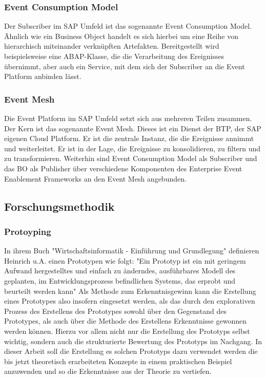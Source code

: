 \subsubsection*{Event Consumption Model}
\label{ecm}
Der Subscriber im SAP Umfeld ist das sogenannte Event Consumption Model. Ähnlich wie ein Business Object handelt es sich hierbei um eine Reihe von hierarchisch miteinander verknüpften Artefakten. Bereitgestellt wird beispielsweise eine \ac{ABAP}-Klasse, die die Verarbeitung des Ereignisses übernimmt, aber auch ein Service, mit dem sich der Subscriber an die Event Platform anbinden lässt. \cite[Vgl.][]{sapse_bes}

\subsubsection*{Event Mesh}
Die Event Platform im  SAP Umfeld setzt sich aus mehreren Teilen zusammen. Der Kern ist das sogenannte Event Mesh. Dieses ist ein Dienst der \ac{BTP}, der SAP eigenen Cloud Platform. Er ist die zentrale Instanz, die die Ereignisse annimmt und weiterleitet. Er ist in der Lage, die Ereignisse zu konsolidieren, zu filtern und zu transformieren. Weiterhin sind Event Consumption Model als Subscriber und das \ac{BO} als Publisher über verschiedene Komponenten des Enterprise Event Enablement Frameworks an den Event Mesh angebunden.\ \cite[Vgl.][]{sapse_evm}

\subsection{Forschungsmethodik}
\subsubsection*{Protoyping}
\label{Protoyping}
In ihrem Buch "Wirtschaftsinformatik - Einführung und Grundlegung" definieren Heinrich u.A. einen Prototypen wie folgt: "Ein Prototyp ist ein mit geringem Aufwand hergestelltes und einfach zu änderndes, ausführbares Modell des geplanten, im Entwicklungsprozess befindlichen Systems, das erprobt und beurteilt werden kann" \cite[S. 114]{heinrich2007wirtschaftsinformatik}
Als Methode zum Erkenntnisgewinn kann die Erstellung eines Prototypes also insofern eingesetzt werden, als das durch den explorativen Prozess des Erstellens des Prototypes sowohl über den Gegenstand des Prototypes, als auch über die Methode des Erstellens Erkenntnisse gewonnen werden können. Hierzu vor allem nicht nur die Erstellung des Prototyps selbst wichtig, sondern auch die strukturierte Bewertung des Prototyps im Nachgang. \cite[S. 119]{heinrich2007wirtschaftsinformatik} In dieser Arbeit soll die Erstellung es solchen Prototyps dazu verwendet werden die bis jetzt theoretisch erarbeiteten Konzepte in einem praktischen Beispiel anzuwenden und so die Erkenntnisse aus der Theorie zu vertiefen.


